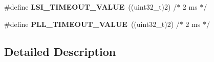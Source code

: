 \begin{DoxyCompactItemize}
\item 
\hypertarget{group___r_c_c___timeout_gad52c7f624c88b0c82ab41b9dbd2b347f}{\#define {\bfseries L\-S\-I\-\_\-\-T\-I\-M\-E\-O\-U\-T\-\_\-\-V\-A\-L\-U\-E}~((uint32\-\_\-t)2)      /$\ast$ 2 ms $\ast$/}\label{group___r_c_c___timeout_gad52c7f624c88b0c82ab41b9dbd2b347f}

\item 
\hypertarget{group___r_c_c___timeout_gad54d8ad9b3511329efee38b3ad0665de}{\#define {\bfseries P\-L\-L\-\_\-\-T\-I\-M\-E\-O\-U\-T\-\_\-\-V\-A\-L\-U\-E}~((uint32\-\_\-t)2)      /$\ast$ 2 ms $\ast$/}\label{group___r_c_c___timeout_gad54d8ad9b3511329efee38b3ad0665de}

\end{DoxyCompactItemize}


\subsection{Detailed Description}
